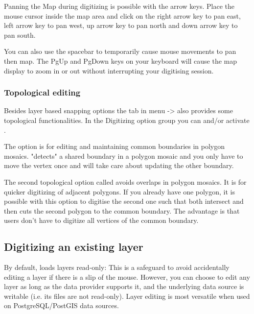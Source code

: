
Panning the Map during digitizing is possible with the arrow keys. Place
the mouse cursor inside the map area and click on the right arrow key to
pan east, left arrow key to pan west, up arrow key to pan north and down
arrow key to pan south.

You can also use the spacebar to temporarily cause mouse movements to pan
then map. The PgUp and PgDown keys on your keyboard will cause the map
display to zoom in or out without interrupting your digitising session.

\subsubsection{Topological editing}

Besides layer based snapping options the  tab in menu
 -> 
also provides some topological functionalities.
In the Digitizing option group you can  and/or activate
.


The option  is for editing and maintaining
common boundaries in polygon mosaics. \qg "detects" a shared boundary in
a polygon mosaic and you only have to move the vertex once and \qg will take
care about updating the other boundary.


The second topological option called 
avoids overlaps in polygon mosaics. It is for quicker digitizing of adjacent polygons.
If you already have one polygon, it is possible with this option to digitise the second
one such that both intersect and \qg then cuts the second polygon to the common boundary.
The advantage is that users don't have to digitize all vertices of the common boundary.

\subsection{Digitizing an existing layer}
\label{sec:edit_existing_layer}

By default, \qg loads layers read-only: This is a safeguard
to avoid accidentally editing a layer if there is a slip of the mouse.
However, you can choose to edit any layer as long as the data provider
supports it, and the underlying data source is writable (i.e. its files are
not read-only). Layer editing is most versatile when used on
PostgreSQL/PostGIS data sources.

